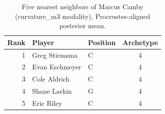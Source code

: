 \begin{table}[htbp]
  \centering\small
  \begin{tabular}{rllc}
    \toprule
    Rank & Player & Position & Archetype \\
    \midrule
    1 & Greg Stiemsma & C & 4 \\
    2 & Evan Eschmeyer & C & 4 \\
    3 & Cole Aldrich & C & 4 \\
    4 & Shane Larkin & G & 4 \\
    5 & Eric Riley & C & 4 \\
    \bottomrule
  \end{tabular}
  \caption{Five nearest neighbors of Marcus Camby (curvature_m3 modality), Procrustes-aligned posterior mean.}
  \label{tab:Marcus_Camby_neighbors_curvature_m3}
\end{table}

